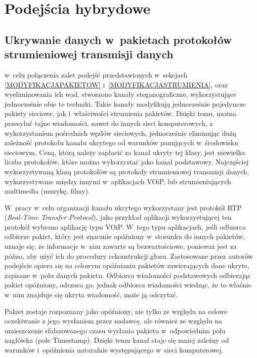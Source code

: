 \documentclass[a4paper, twoside, 12pt]{report}
\begin{document}
    \section{Podejścia hybrydowe}
        \subsection{Ukrywanie danych w~pakietach protokołów strumieniowej transmisji danych}
        w~celu połączenia zalet podejść przedstawionych w~sekcjach
        \ref{MODYFIKACJAPAKIETOW} i~\ref{MODYFIKACJASTRUMIENIA}, oraz wyeliminowania
        ich wad, stworzono kanały steganograficzne, wykorzystujące jednocześnie obie te
        techniki. Takie kanały modyfikują jednocześnie pojedyncze pakiety sieciowe,
        jak i~właściwości strumienia pakietów. Dzięki temu, można przesyłać tajne wiadomości,
        nawet do innych sieci komputerowych, z wykorzystaniem pośrednich węzłów sieciowych,
        jednocześnie eliminując dużą zależność protokołu kanału ukrytego od warunków
        panujących w~środowisku sieciowym. Ceną, którą należy zapłacić za kanał
        ukryty tej klasy, jest niewielka liczba protokołów, które można wykorzystać
        jako kanał podstawowy. Najczęściej wykorzystywaną klasą protokołów są
        protokoły strumieniowej transmisji danych, wykorzystywane między innymi
        w~aplikacjach VOiP, lub strumieniujących multimedia (muzykę, filmy).

        W~pracy \cite{VOIPSTEGANOGRAPHY} w~celu organizacji kanału ukrytego wykorzystany
        jest protokół RTP (\emph{Real-Time Transfer Protocol}), jako przykład aplikacji
        wykorzystującej ten protokół wybrano aplikację typu VOiP. W~tego typu aplikacjach,
        jeśli odbiorca odbierze pakiet, który jest znacznie opóźniony w~stosunku
        do innych pakietów, uznaje się, że informacje w~nim zawarte są bezwartościowe,
        ponieważ jest za późno, aby użyć ich do procedury rekonstrukcji głosu.
        Zastosowane przez autorów podejście opiera się na celowym opóźnianiu pakietów
        zawierających dane ukryte, zapisane w~polu danych pakietu.
        Odbiorca wiadomości podstawowych odbierając pakiet
        opóźniony, odrzuca go, jednak odbiorca wiadomości wiedząc, że to właśnie
        w~nim znajduje się ukryta wiadomość, może ją odczytać.

        Pakiet zostaje rozpoznany jako opóźniony, nie tylko ze względu na celowe
        oczekiwanie z jego wysłaniem przez nadawcę, ale również ze względu
        na umieszczenie sfałszowanego czasu wysłania pakietu w~odpowiednim
        polu nagłówka (pole Timestamp). Dzięki temu kanał staje się mniej zależny
        od warunków i~opóźnienia naturalnie występującego w~sieci komputerowej.
\end{document}
